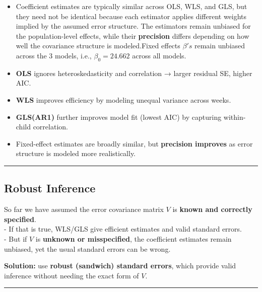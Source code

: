 \documentclass[
  letterpaper,
  DIV=11,
  numbers=noendperiod]{scrreprt}
\providecommand{\tightlist}{%
  \setlength{\itemsep}{0pt}\setlength{\parskip}{0pt}}\usepackage{longtable,booktabs,array}
\begin{document}
\begin{itemize}
\tightlist
\item
  Coefficient estimates are typically similar across OLS, WLS, and GLS,
  but they need not be identical because each estimator applies
  different weights implied by the assumed error structure. The
  estimators remain unbiased for the population-level effects, while
  their \textbf{precision} differs depending on how well the covariance
  structure is modeled.Fixed effects \(\beta's\) remain unbiased across
  the 3 models, i.e., \(\beta_0 = 24.662\) across all models.
\item
  \textbf{OLS} ignores heteroskedasticity and correlation → larger
  residual SE, higher AIC.\\
\item
  \textbf{WLS} improves efficiency by modeling unequal variance across
  weeks.\\
\item
  \textbf{GLS(AR1)} further improves model fit (lowest AIC) by capturing
  within-child correlation.\\
\item
  Fixed-effect estimates are broadly similar, but \textbf{precision
  improves} as error structure is modeled more realistically.
\end{itemize}

\begin{center}\rule{0.5\linewidth}{0.5pt}\end{center}

\hypertarget{robust-inference}{%
\subsection*{Robust Inference}\label{robust-inference}}

So far we have assumed the error covariance matrix \(V\) is
\textbf{known and correctly specified}.\\
- If that is true, WLS/GLS give efficient estimates and valid standard
errors.\\
- But if \(V\) is \textbf{unknown or misspecified}, the coefficient
estimates remain unbiased, yet the usual standard errors can be wrong.

\textbf{Solution:} use \textbf{robust (sandwich) standard errors}, which
provide valid inference without needing the exact form of \(V\).

\begin{center}\rule{0.5\linewidth}{0.5pt}\end{center}
\end{document}
